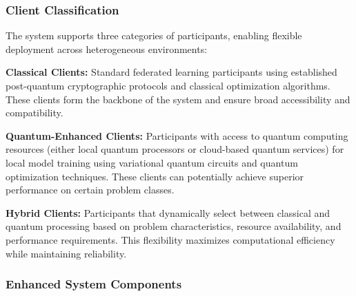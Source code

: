 \documentclass[10pt,journal,compsoc]{IEEEtran}
\begin{document}
\subsubsection{Client Classification}
The system supports three categories of participants, enabling flexible deployment across heterogeneous environments:

\textbf{Classical Clients:} Standard federated learning participants using established post-quantum cryptographic protocols and classical optimization algorithms. These clients form the backbone of the system and ensure broad accessibility and compatibility.

\textbf{Quantum-Enhanced Clients:} Participants with access to quantum computing resources (either local quantum processors or cloud-based quantum services) for local model training using variational quantum circuits and quantum optimization techniques. These clients can potentially achieve superior performance on certain problem classes.

\textbf{Hybrid Clients:} Participants that dynamically select between classical and quantum processing based on problem characteristics, resource availability, and performance requirements. This flexibility maximizes computational efficiency while maintaining reliability.

\subsubsection{Enhanced System Components}
\end{document}
